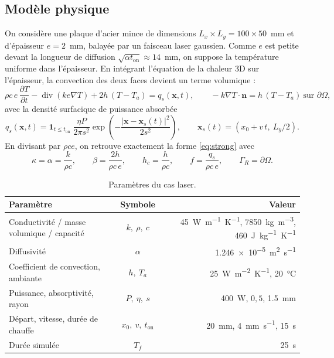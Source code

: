 \documentclass[11pt,a4paper]{article}
\DeclareMathOperator{\divg}{div}
\begin{document}
\subsection{Modèle physique}
On considère une plaque d'acier mince de dimensions $L_x\times L_y = 100\times50$~mm et d'épaisseur
$e=2$~mm, balayée par un faisceau laser gaussien. Comme $e$ est petite devant la longueur de diffusion
$\sqrt{\alpha t_{\text{on}}}\approx 14$~mm, on suppose la température uniforme dans l'épaisseur.
En intégrant l'équation de la chaleur 3D sur l'épaisseur, la convection des deux faces devient un terme
volumique :
\begin{equation}\label{eq:plate}
  \rho c\, e\, \frac{\partial T}{\partial t} - \divg(k e \nabla T) + 2h\,(T-T_a) = q_s(\bm{x},t),
  \qquad -k\nabla T\cdot\bm{n} = h\,(T-T_a) \ \text{sur } \partial\Omega,
\end{equation}
avec la densité surfacique de puissance absorbée
\begin{equation}
  q_s(\bm{x},t) = \mathbf{1}_{t\le t_{\text{on}}}\;\frac{\eta P}{2\pi s^2}
  \exp\!\left(-\frac{|\bm{x}-\bm{x}_s(t)|^2}{2s^2}\right), \qquad
  \bm{x}_s(t) = \left(x_0 + v\,t,\ L_y/2\right).
\end{equation}
En divisant par $\rho c e$, on retrouve exactement la forme \eqref{eq:strong} avec
\[
  \kappa = \alpha = \frac{k}{\rho c}, \qquad \beta = \frac{2h}{\rho c\,e}, \qquad
  h_c = \frac{h}{\rho c}, \qquad f = \frac{q_s}{\rho c\, e}, \qquad \Gamma_R = \partial\Omega .
\]

\begin{table}[H]
\centering\small
\begin{tabular}{l c r}\toprule
Paramètre & Symbole & Valeur \\ \midrule
Conductivité / masse volumique / capacité & $k,\ \rho,\ c$ & \SI{45}{W.m^{-1}.K^{-1}}, \SI{7850}{kg.m^{-3}}, \SI{460}{J.kg^{-1}.K^{-1}} \\
Diffusivité & $\alpha$ & \SI{1.246e-5}{m^2.s^{-1}} \\
Coefficient de convection, ambiante & $h,\ T_a$ & \SI{25}{W.m^{-2}.K^{-1}}, \SI{20}{\celsius} \\
Puissance, absorptivité, rayon & $P,\ \eta,\ s$ & \SI{400}{W}, $0{,}5$, \SI{1.5}{mm} \\
Départ, vitesse, durée de chauffe & $x_0,\ v,\ t_{\text{on}}$ & \SI{20}{mm}, \SI{4}{mm.s^{-1}}, \SI{15}{s} \\
Durée simulée & $T_f$ & \SI{25}{s} \\ \bottomrule
\end{tabular}
\caption{Paramètres du cas laser.}
\end{table}
\end{document}
